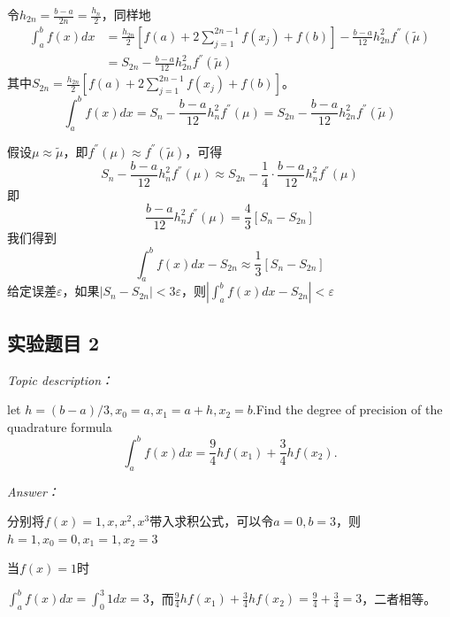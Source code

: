 \documentclass[12pt]{ctexart}
\begin{document}
	令$h_{2n}=\frac{b-a}{2n}=\frac{h_n}{2}$，同样地
	\begin{equation*}
	\begin{split}
	\int_a^bf(x)dx&=\frac{h_{2n}}{2}[f(a)+2\sum_{j=1}^{2n-1}f(x_j)+f(b)]-\frac{b-a}{12}h_{2n}^2f^{''}(\widetilde\mu) \\
	&=S_{2n}-\frac{b-a}{12}h_{2n}^2f^{''}(\widetilde\mu)
	\end{split}
	\end{equation*}
	其中$S_{2n}=\frac{h_{2n}}{2}[f(a)+2\sum\limits_{j=1}^{2n-1}f(x_j)+f(b)]$。
	\begin{equation*}
	\int_a^bf(x)dx=S_n-\frac{b-a}{12}h_n^2f^{''}(\mu)=S_{2n}-\frac{b-a}{12}h_{2n}^2f^{''}(\widetilde\mu)
	\end{equation*}
	
	假设$\mu\approx\widetilde\mu$，即$f^{''}(\mu)\approx f^{''}(\widetilde\mu)$，可得
	\begin{equation*}
	S_n-\frac{b-a}{12}h_n^2f^{''}(\mu)\approx S_{2n}-\frac{1}{4}\cdot\frac{b-a}{12}h_{n}^2f^{''}(\mu)
	\end{equation*}
	即
	\begin{equation*}
	\frac{b-a}{12}h_n^2f^{''}(\mu)=\frac{4}{3}[S_n-S_{2n}]
	\end{equation*}
	我们得到
	\begin{equation*}
	\int_a^bf(x)dx-S_{2n}\approx\frac{1}{3}[S_n-S_{2n}]
	\end{equation*}
	给定误差$\varepsilon$，如果$|S_n-S_{2n}|<3\varepsilon$，则$|\int_a^bf(x)dx-S_{2n}|<\varepsilon$
	
	\subsection{实验题目 2}
	\textit{Topic description：}
	
	let $h=(b-a)/3,x_0=a,x_1=a+h,x_2=b$.Find the degree of precision of the quadrature formula
	\begin{equation*}
	\int_{a}^{b}f(x)dx=\frac{9}{4}hf(x_1)+\frac{3}{4}hf(x_2).
	\end{equation*}
	
	\textit{Answer：}
	
	分别将$f(x)=1,x,x^2,x^3$带入求积公式，可以令$a=0,b=3$，则$h=1,x_0=0,x_1=1,x_2=3$
	
	当$f(x)=1$时
	
	$\int_{a}^{b}f(x)dx=\int_{0}^{3}1dx=3$，而$\frac{9}{4}hf(x_1)+\frac{3}{4}hf(x_2)=\frac{9}{4}+\frac{3}{4}=3$，二者相等。
	
\end{document}
